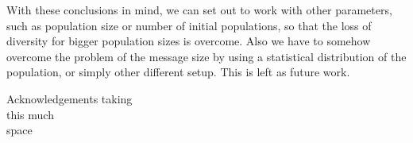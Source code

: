 \documentclass[sigconf]{acmart}
\begin{document}
With these conclusions in mind, we can set out to work with other
parameters, such as population size or number of initial populations,
so that the loss of diversity for bigger population sizes is
overcome. Also we have to somehow overcome the problem of the message
size by using a statistical distribution of the population, or simply
other different setup. This is left as future work.%



\begin{acks}
Acknowledgements taking\\
this much\\
space

\end{acks}


 
\end{document}
